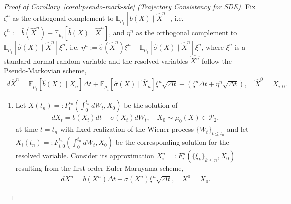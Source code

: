 \documentclass[11pt, a4paper, oneside, reqno]{amsart}
\begin{document}
\begin{proof}[Proof of Corollary~\ref{corol:pseudo-mark-sde} (Trajectory Consistency for SDE)]\label{proof:pseudomark sde}
Fix $\zeta^n$ as the orthogonal complement to $\mathbb{E}_{\mu_t}[b(X)\mid \hat{X}^n]$, i.e. $\zeta^n:= \hat{b}(\hat{X}^n) - \mathbb{E}_{\mu_t}[\hat{b}(X)\mid \hat{X}^n]$, and $\eta^n$ as the orthogonal complement to $\mathbb{E}_{\mu_t}[\hat{\sigma}(X)\mid \hat{X}^n]\xi^n$, i.e. $\eta^n:= \hat{\sigma}(\hat{X}^n)\xi^n - \mathbb{E}_{\mu_t}[\hat{\sigma}(X)\mid \hat{X}^n]\xi^n$, 
where $\xi^n$ is a standard normal random variable and the resolved variables $\hat{X^n}$ follow
the Pseudo-Markovian scheme,
    \begin{eqnarray}
        d\hat{X}^n=\mathbb{E}_{\mu_t}[\hat{b}(X)\mid \hat{X}_n]\Delta t + \mathbb{E}_{\mu_t}[\hat{\sigma}(X)\mid \hat{X}_n]\xi^n\sqrt{\Delta t} +(\zeta^n\Delta t + \eta^n\sqrt{\Delta t}), \quad \hat{X}^0 = X_{i,0}. %
    \end{eqnarray}
\begin{enumerate}
    \item Let $X(t_n)=:F_0^{t_n}(\int_0^{t_n}dW_t,X_0)$ be the solution of
    \begin{eqnarray}
        dX_t=b(X_t)dt+\sigma(X_t) dW_t, \quad X_0\sim\mu_0(X)\in\mathcal{P}_2,
    \end{eqnarray}
    at time $t=t_n$ with fixed realization of the Wiener process $\{W_t\}_{t\leq t_n}$ and let $X_i(t_n)=:F_{i,0}^{t_n}(\int_0^{t_n}d W_t,X_0)$ be the corresponding solution for the resolved variable. Consider its approximation $X_i^n=:F_{i}^n(\{\xi_k\}_{k\leq n},X_0)$ resulting from the first-order Euler-Maruyama scheme,
    \begin{eqnarray}
        dX^n=b(X^n)\Delta t + \sigma(X^n)\xi^n\sqrt{\Delta t}, \quad X^0=X_0.
    \end{eqnarray}

\end{enumerate}
\end{proof}
\end{document}
